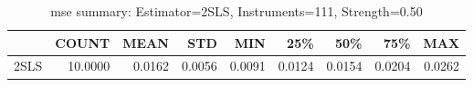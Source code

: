 \begin{table}[ht]
\centering
\caption{mse summary: Estimator=2SLS, Instruments=111, Strength=0.50}
\begin{tabular}{lrrrrrrrr}
\toprule
 & COUNT & MEAN & STD & MIN & 25\% & 50\% & 75\% & MAX \\
\midrule
2SLS & 10.0000 & 0.0162 & 0.0056 & 0.0091 & 0.0124 & 0.0154 & 0.0204 & 0.0262 \\
\bottomrule
\end{tabular}
\end{table}
